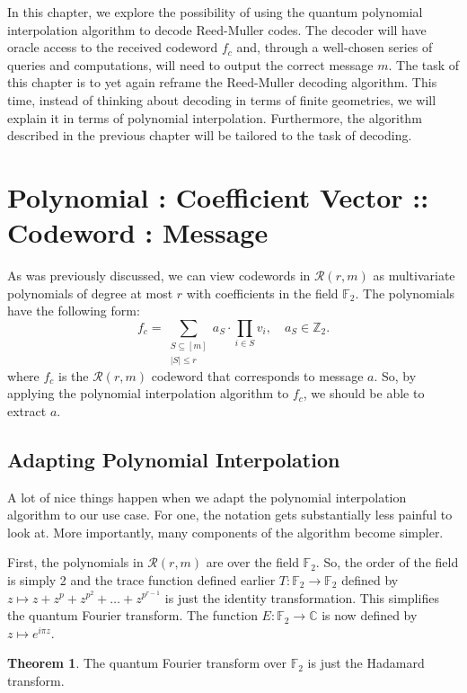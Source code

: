 \documentclass[12pt,twoside]{reedthesis}
\theoremstyle{definition}
\newtheorem{theorem}{Theorem}[chapter]
\newcommand{\Z}{\mathbb{Z}}
\newcommand{\C}{\mathbb{C}}
\newcommand{\F}{\mathbb{F}}
\begin{document}
In this chapter, we explore the possibility of using the quantum polynomial interpolation algorithm to decode Reed-Muller codes. The decoder will have oracle access to the received codeword $f_c$ and, through a well-chosen series of queries and computations, will need to output the correct message $m$. The task of this chapter is to yet again reframe the Reed-Muller decoding algorithm. This time, instead of thinking about decoding in terms of finite geometries, we will explain it in terms of polynomial interpolation. Furthermore, the algorithm described in the previous chapter will be tailored to the task of decoding.
 
\section{Polynomial : Coefficient Vector :: Codeword : Message}
As was previously discussed, we can view codewords in $\mathscr{R}(r,m)$ as multivariate polynomials of degree at most $r$ with coefficients in the field $\F_2$. The polynomials have the following form:
\begin{equation*}
f_c = \sum_{\substack{S \subseteq [m] \\ \lvert S \rvert \leq r}} a_S \cdot \prod_{i \in S} v_i,  \quad a_S \in \Z_2.
\end{equation*}
where $f_c$ is the $\mathscr{R}(r,m)$ codeword that corresponds to message $a$. So, by applying the polynomial interpolation algorithm to $f_c$, we should be able to extract $a$. 


\subsection{Adapting Polynomial Interpolation}
A lot of nice things happen when we adapt the polynomial interpolation algorithm to our use case. For one, the notation gets substantially less painful to look at. More importantly, many components of the algorithm become simpler.

First, the polynomials in $\mathscr{R}(r,m)$ are over the field $\F_2$. So, the order of the field is simply 2 and the trace function defined earlier $T:\F_2 \rightarrow \F_2$ defined by $z \mapsto z + z^p + z^{p^2} + \ldots + z^{p^{r-1}}$ is just the identity transformation. This simplifies the quantum Fourier transform. The function $E: \F_2 \rightarrow \C$ is now defined by $z \longmapsto e^{i\pi z}$.

 
\begin{theorem} The quantum Fourier transform over $\F_2$ is just the Hadamard transform.
\end{theorem}
\end{document}
